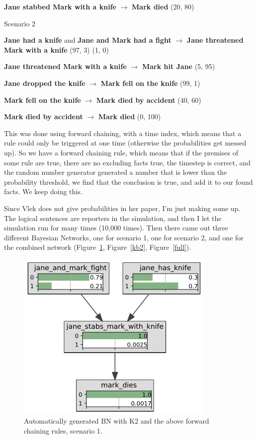\textbf{Jane stabbed Mark with a knife} $\rightarrow$ \textbf{Mark died} (20, 80)

Scenario 2

\textbf{Jane had a knife} and \textbf{Jane and Mark had a fight} $\rightarrow$ \textbf{Jane threatened Mark with a knife} (97, 3) (1, 0)

\textbf{Jane threatened Mark with a knife} $\rightarrow$  \textbf{Mark hit Jane} (5, 95)

\textbf{Jane dropped the knife} $\rightarrow$ \textbf{Mark fell on the knife} (99, 1)

\textbf{Mark fell on the knife} $\rightarrow$ \textbf{Mark died by accident} (40, 60)

 \textbf{Mark died by accident} $\rightarrow$  \textbf{Mark died}  (0, 100)

This was done using forward chaining, with a time index, which means that a rule could only be triggered at one time (otherwise the probabilities get messed up). So we have a forward chaining rule, which means that if the premises of some rule are true, there are no excluding facts true, the timestep is correct, and the random number generator generated a number that is lower than the probability threshold, we find that the conclusion is true, and add it to our found facts. We keep doing this.


Since Vlek does not give probabilities in her paper, I'm just making some up. The logical sentences are reporters in the simulation, and then I let the simulation run for many times (10,000 times). Then there came out three different Bayesian Networks, one for scenario 1, one for scenario 2, and one for the combined network (Figure~\ref{kb1}, Figure~\ref{kb2}, Figure~\ref{full}).

\begin{figure}[htbp]
\begin{center}
\includegraphics[scale = 0.5]{images/Kb1.png}
\caption{Automatically generated BN with K2 and the above forward chaining rules, scenario 1.}
\label{kb1}
\end{center}
\end{figure}

